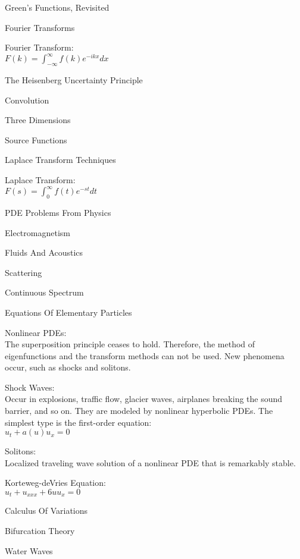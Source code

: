 Green's Functions, Revisited

Fourier Transforms

Fourier Transform: \\
$F(k)=\int_{-\infty}^{\infty} f(k) e^{-ikx} dx$

The Heisenberg Uncertainty Principle

Convolution

Three Dimensions

Source Functions

Laplace Transform Techniques

Laplace Transform: \\
$F(s)=\int_0^{\infty} f(t) e^{-st} dt$

PDE Problems From Physics

Electromagnetism

Fluids And Acoustics

Scattering

Continuous Spectrum

Equations Of Elementary Particles

Nonlinear PDEs: \\
The superposition principle ceases to hold. Therefore, the method of eigenfunctions and the transform methods can not be used. New phenomena occur, such as shocks and solitons.

Shock Waves: \\
Occur in explosions, traffic flow, glacier waves, airplanes breaking the sound barrier, and so on. They are modeled by nonlinear hyperbolic PDEs. The simplest type is the first-order equation: \\
$u_t+a(u) u_x=0$

Solitons: \\
Localized traveling wave solution of a nonlinear PDE that is remarkably stable.

Korteweg-deVries Equation: \\
$u_t+u_{xxx}+6uu_x=0$

Calculus Of Variations

Bifurcation Theory

Water Waves